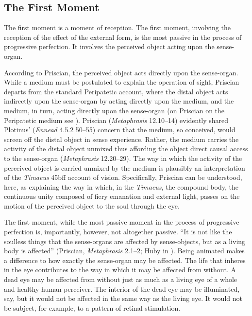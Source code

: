 \documentclass[12pt]{article}
\begin{document}
\subsection{The First Moment} %
\label{sub:the_first_moment}

The first moment is a moment of reception. The first moment, involving the reception of the effect of the external form, is the most passive in the process of progressive perfection. It involves the perceived object acting upon the sense-organ. 

According to Priscian, the perceived object acts directly upon the sense-organ. While a medium must be postulated to explain the operation of sight, Priscian departs from the standard Peripatetic account, where the distal object acts indirectly upon the sense-organ by acting directly upon the medium, and the medium, in turn, acting directly upon the sense-organ (on Priscian on the Peripatetic medium see \citealt{Ganson:2002aa}). Priscian (\emph{Metaphrasis} 12.10--14) evidently shared Plotinus' (\emph{Ennead} 4.5.2 50–55) concern that the medium, so conceived, would screen off the distal object in sense experience. Rather, the medium carries the activity of the distal object unmixed thus affording the object direct causal access to the sense-organ (\emph{Metaphrasis} 12.20--29). The way in which the activity of the perceived object is carried unmixed by the medium is plausibly an interpretation of the \emph{Timaeus} 45bff account of vision. Specifically, Priscian can be understood, here, as explaining the way in which, in the \emph{Timaeus}, the compound body, the continuous unity composed of fiery emanation and external light, passes on the motion of the perceived object to the soul through the eye.

The first moment, while the most passive moment in the process of progressive perfection is, importantly, however, not altogether passive. ``It is not like the soulless things that the sense-organs are affected by sense-objects, but as a living body is affected'' (Priscian, \emph{Metaphrasis} 2.1--2; Huby in \citealt[9--10]{Sorabji:1997ly}). Being animated makes a difference to how exactly the sense-organ may be affected. The life that inheres in the eye contributes to the way in which it may be affected from without. A dead eye may be affected from without just as much as a living eye of a whole and healthy human perceiver. The interior of the dead eye may be illuminated, say, but it would not be affected in the same way as the living eye. It would not be subject, for example, to a pattern of retinal stimulation. 
\end{document}
